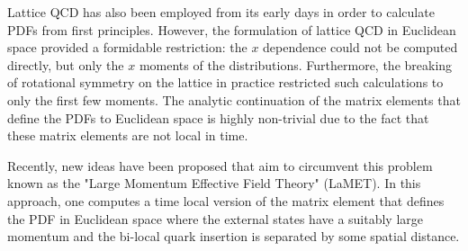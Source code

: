 
Lattice QCD has also been employed from its early days in order  to calculate PDFs from first principles.  However, the
formulation of lattice QCD in Euclidean space provided a formidable
restriction: the $x$ dependence could not be computed directly, but
only the $x$ moments of the distributions.  Furthermore, the breaking
of rotational symmetry on the lattice in practice restricted such
calculations to only the first few moments. 
The analytic continuation of the matrix elements that define the PDFs to Euclidean space is highly non-trivial due to the fact that these matrix elements are not local in time.

Recently, new ideas have
been proposed that aim to circumvent this
problem~\cite{Ji:2013dva,Ji:2014gla} known as the "Large Momentum Effective Field Theory" (LaMET).
In this approach, one computes a time local version of the matrix element that defines the PDF in Euclidean space
where the external states have a suitably large momentum  and the
bi-local quark insertion is separated by some spatial distance.

